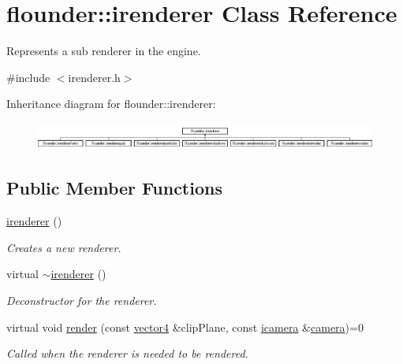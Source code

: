 \hypertarget{classflounder_1_1irenderer}{}\section{flounder\+:\+:irenderer Class Reference}
\label{classflounder_1_1irenderer}


Represents a sub renderer in the engine.  




{\ttfamily \#include $<$irenderer.\+h$>$}

Inheritance diagram for flounder\+:\+:irenderer\+:\begin{figure}[H]
\begin{center}
\leavevmode
\includegraphics[height=0.914286cm]{classflounder_1_1irenderer}
\end{center}
\end{figure}
\subsection*{Public Member Functions}
\begin{DoxyCompactItemize}
\item 
\hyperlink{classflounder_1_1irenderer_a2a7c7ca8dbde0b7322a49ed909c9b6f6}{irenderer} ()
\begin{DoxyCompactList}\small\item\em Creates a new renderer. \end{DoxyCompactList}\item 
virtual \hyperlink{classflounder_1_1irenderer_a241b5071119fdfe45630e366dfa16e2b}{$\sim$irenderer} ()
\begin{DoxyCompactList}\small\item\em Deconstructor for the renderer. \end{DoxyCompactList}\item 
virtual void \hyperlink{classflounder_1_1irenderer_a3f355dc39e2680bf3f3441d3dfaaa010}{render} (const \hyperlink{classflounder_1_1vector4}{vector4} \&clip\+Plane, const \hyperlink{classflounder_1_1icamera}{icamera} \&\hyperlink{classflounder_1_1camera}{camera})=0
\begin{DoxyCompactList}\small\item\em Called when the renderer is needed to be rendered. \end{DoxyCompactList}\end{DoxyCompactItemize}



